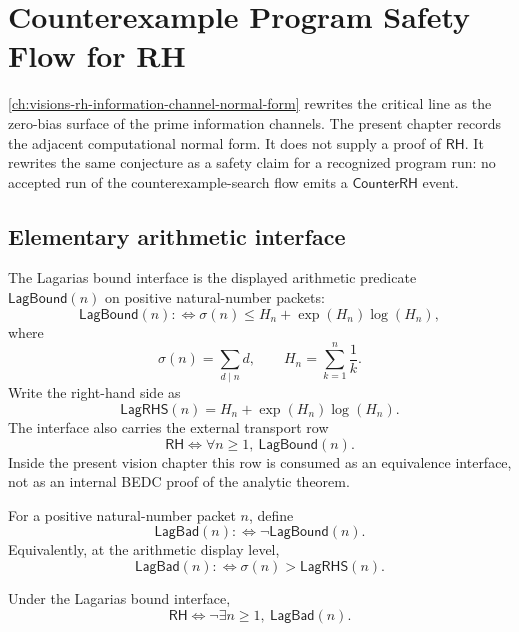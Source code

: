\chapter{Counterexample Program Safety Flow for RH}
\label{ch:visions-rh-counterexample-program-safety-flow}

\autoref{ch:visions-rh-information-channel-normal-form} rewrites the
critical line as the zero-bias surface of the prime information channels.
The present chapter records the adjacent computational normal form.  It
does not supply a proof of $\mathsf{RH}$.  It rewrites the same conjecture
as a safety claim for a recognized program run: no accepted run of the
counterexample-search flow emits a $\mathsf{CounterRH}$ event.

\section{Elementary arithmetic interface}
\label{sec:rh-counterprogram-elementary-interface}

\begin{definition}
\label{def:rh-lagarias-bound-interface}
The Lagarias bound interface is the displayed arithmetic predicate
$\mathsf{LagBound}(n)$ on positive natural-number packets:
$$
\mathsf{LagBound}(n)
:\Longleftrightarrow
\sigma(n)\leq H_n+\exp(H_n)\log(H_n),
$$
where
$$
\sigma(n)=\sum_{d\mid n}d,
\qquad
H_n=\sum_{k=1}^{n}\frac{1}{k}.
$$
Write the right-hand side as
$$
\mathsf{LagRHS}(n)=H_n+\exp(H_n)\log(H_n).
$$
The interface also carries the external transport row
$$
\mathsf{RH}
\Longleftrightarrow
\forall n\geq 1,\ \mathsf{LagBound}(n).
$$
Inside the present vision chapter this row is consumed as an equivalence
interface, not as an internal BEDC proof of the analytic theorem.
\end{definition}

\begin{definition}
\label{def:rh-lagarias-bad-packet}
For a positive natural-number packet $n$, define
$$
\mathsf{LagBad}(n)
:\Longleftrightarrow
\neg\mathsf{LagBound}(n).
$$
Equivalently, at the arithmetic display level,
$$
\mathsf{LagBad}(n)
:\Longleftrightarrow
\sigma(n)>\mathsf{LagRHS}(n).
$$
\end{definition}

\begin{proposition}
\label{prop:rh-lagbad-counter-packets}
Under the Lagarias bound interface,
$$
\mathsf{RH}
\Longleftrightarrow
\neg\exists n\geq 1,\ \mathsf{LagBad}(n).
$$
\end{proposition}

